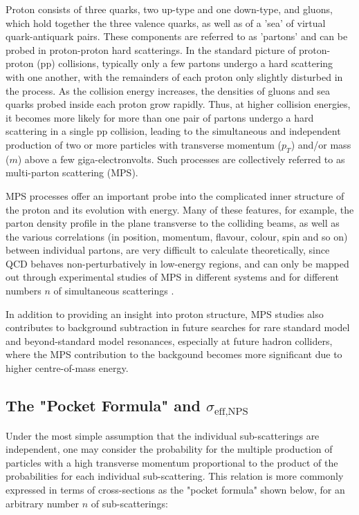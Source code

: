 \documentclass[10pt,twocolumn]{article}
\begin{document}
Proton consists of three quarks, two up-type and one down-type, and gluons, which hold together the three valence quarks, as well as of a 'sea' of virtual quark-antiquark pairs. These components are referred to as 'partons' and can be probed in proton-proton hard scatterings. In the standard picture of proton-proton (pp) collisions, typically only a few partons undergo a hard scattering with one another, with the remainders of each proton only slightly disturbed in the process. As the collision energy increases, the densities of gluons and sea quarks probed inside each proton grow rapidly. Thus, at higher collision energies, it becomes more likely for more than one pair of partons undergo a hard scattering in a single pp collision, leading to the simultaneous and independent production of two or more particles with transverse momentum ($p_T$) and/or mass ($m$) above a few giga-electronvolts. Such processes are collectively referred to as multi-parton scattering (MPS).

MPS processes offer an important probe into the complicated inner structure of the proton and its evolution with energy.\cite{DIEHL_MPI}\cite{BLOK_MPS} Many of these features, for example, the parton density profile in the plane transverse to the colliding beams, as well as the various correlations (in position, momentum, flavour, colour, spin and so on) between individual partons, are very difficult to calculate theoretically, since QCD behaves non-perturbatively in low-energy regions, and can only be mapped out through experimental studies of MPS in different systems and for different numbers $n$ of simultaneous scatterings \cite{MPI_LHC}.

In addition to providing an insight into proton structure, MPS studies also contributes to background subtraction in future searches for rare standard model and beyond-standard model resonances, especially at future hadron colliders, where the MPS contribution to the backgound becomes more significant due to higher centre-of-mass energy.\cite{DdE_TPS}\cite{YJZ_TRI_JPSI}

\subsection{The "Pocket Formula" and \texorpdfstring{$\sigma_{\text{eff,NPS}}$}{TPS Effective Cross-Section}}

Under the most simple assumption that the individual sub-scatterings are independent, one may consider the probability for the multiple production of particles with a high transverse momentum proportional to the product of the probabilities for each individual sub-scattering. This relation is more commonly expressed in terms of cross-sections as the "pocket formula" shown below, for an arbitrary number $n$ of sub-scatterings:
\end{document}
